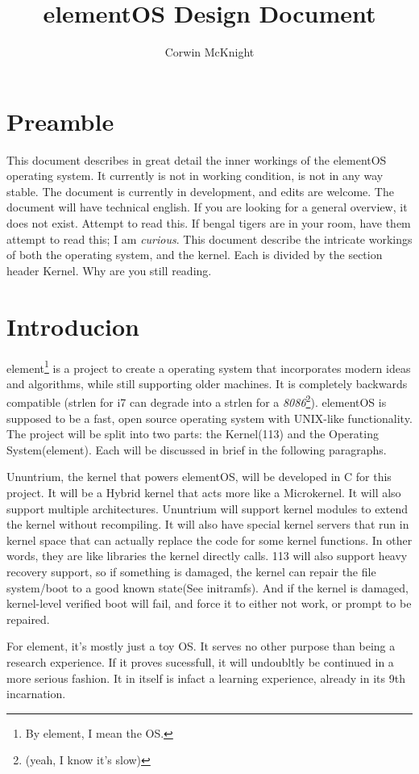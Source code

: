 \documentclass[12pt]{article}
\title{elementOS Design Document}
\author{Corwin McKnight}
\begin{document}
\maketitle
\tableofcontents
\clearpage
\section{Preamble}
This document describes in great detail the inner workings of the elementOS operating system. It currently is not in working condition, is not in any way stable. The document is currently in development, and edits are welcome. The document will have technical english. If you are looking for a general overview, it does not exist. Attempt to read this. If bengal tigers are in your room, have them attempt to read this; I am \emph{curious}. This document describe the intricate workings of both the operating system, and the kernel. Each is divided by the section header Kernel. Why are you still reading.

\section{Introducion}
element\footnote{By element, I mean the OS.} is a project to create a operating system that incorporates modern ideas and algorithms, while still supporting older machines. It is completely backwards compatible (strlen for i7 can degrade into a strlen for a \emph{8086}\footnote{(yeah, I know it's slow)}). elementOS is supposed to be a fast, open source operating system with UNIX-like functionality. The project will be split into two parts: the Kernel(113) and the Operating System(element). Each will be discussed in brief in the following paragraphs.

Ununtrium, the kernel that powers elementOS, will be developed in C for this project. It will be a Hybrid kernel that acts more like a Microkernel. It will also support multiple architectures.  Ununtrium will support kernel modules to extend the kernel without recompiling. It will also have special kernel servers that run in kernel space that can actually replace the code for some kernel functions. In other words, they are like libraries the kernel directly calls. 113 will also support heavy recovery support, so if something is damaged, the kernel can repair the file system/boot to a good known state(See initramfs). And if the kernel is damaged, kernel-level verified boot will fail, and force it to either not work, or prompt to be repaired.

For element, it's mostly just a toy OS. It serves no other purpose than being a research experience. If it proves sucessfull, it will undoubltly be continued in a more serious fashion. It in itself is infact a learning experience, already in its 9th incarnation.
\end{document}
